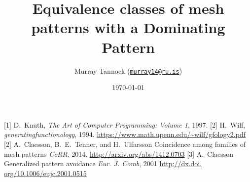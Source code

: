 \documentclass[11pt, aspectratio=1610]{beamer}
\title[Dominating Patterns]{Equivalence classes of mesh patterns with a Dominating Pattern}
\author[M.~Tannock]{Murray Tannock (\href{mailto:murray14@ru.is}{\texttt{murray14@ru.is}})}
\institute[Reykjavik University]
{
\texttt{[image: rulogo]}
}
\date{\today}
\begin{document}
  \begin{frame}
    \titlepage
  \end{frame}





\begin{thebibliography}{10}
  [1]
    D.~Knuth,
    \newblock
    \newblock \emph{The Art of Computer Programming: Volume 1}, 1997.
  [2]
    H.~Wilf,
    \newblock
    \newblock \emph{generatingfunctionology}, 1994.
    \url{https://www.math.upenn.edu/~wilf/gfology2.pdf}
  [2]
    A.~Claesson, B.~E.~Tenner, and H.~Ulfarsson
    \newblock Coincidence among families of mesh patterns
    \newblock \emph{CoRR}, 2014.
    \url{http://arxiv.org/abs/1412.0703}
  [3]
   A.~Claesson
   \newblock Generalized pattern avoidance
   \newblock \emph{Eur. J. Comb}, 2001
   \url{http://dx.doi. org/10.1006/eujc.2001.0515}
  \end{thebibliography}
\end{document}
